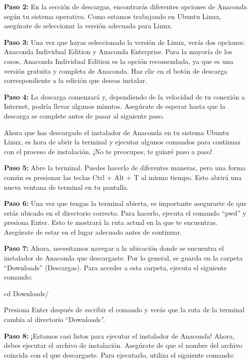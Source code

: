 \documentclass[
  jou,
  floatsintext,
  longtable,
  a4paper,
  nolmodern,
  notxfonts,
  notimes,
  colorlinks=true,linkcolor=blue,citecolor=blue,urlcolor=blue]{apa7}
\newenvironment{Shaded}{\begin{snugshade}}{\end{snugshade}}
\newcommand{\BuiltInTok}[1]{\textcolor[rgb]{0.00,0.23,0.31}{#1}}
\newcommand{\NormalTok}[1]{\textcolor[rgb]{0.00,0.23,0.31}{#1}}
\begin{document}
\textbf{Paso 2:} En la sección de descargas, encontrarás diferentes
opciones de Anaconda según tu sistema operativo. Como estamos trabajando
en Ubuntu Linux, asegúrate de seleccionar la versión adecuada para
Linux.

\textbf{Paso 3:} Una vez que hayas seleccionado la versión de Linux,
verás dos opciones: Anaconda Individual Edition y Anaconda Enterprise.
Para la mayoría de los casos, Anaconda Individual Edition es la opción
recomendada, ya que es una versión gratuita y completa de Anaconda. Haz
clic en el botón de descarga correspondiente a la edición que deseas
instalar.

\textbf{Paso 4:} La descarga comenzará y, dependiendo de la velocidad de
tu conexión a Internet, podría llevar algunos minutos. Asegúrate de
esperar hasta que la descarga se complete antes de pasar al siguiente
paso.

Ahora que has descargado el instalador de Anaconda en tu sistema Ubuntu
Linux, es hora de abrir la terminal y ejecutar algunos comandos para
continuar con el proceso de instalación. ¡No te preocupes, te guiaré
paso a paso!

\textbf{Paso 5:} Abre la terminal. Puedes hacerlo de diferentes maneras,
pero una forma común es presionar las teclas Ctrl + Alt + T al mismo
tiempo. Esto abrirá una nueva ventana de terminal en tu pantalla.

\textbf{Paso 6:} Una vez que tengas la terminal abierta, es importante
asegurarte de que estás ubicado en el directorio correcto. Para hacerlo,
ejecuta el comando ``pwd'' y presiona Enter. Esto te mostrará la ruta
actual en la que te encuentras. Asegúrate de estar en el lugar adecuado
antes de continuar.

\textbf{Paso 7:} Ahora, necesitamos navegar a la ubicación donde se
encuentra el instalador de Anaconda que descargaste. Por lo general, se
guarda en la carpeta ``Downloads'' (Descargas). Para acceder a esta
carpeta, ejecuta el siguiente comando:

\begin{Shaded}
\begin{Highlighting}[]
\BuiltInTok{cd}\NormalTok{ Downloads/}
\end{Highlighting}
\end{Shaded}

Presiona Enter después de escribir el comando y verás que la ruta de la
terminal cambia al directorio ``Downloads''.

\textbf{Paso 8:} ¡Estamos casi listos para ejecutar el instalador de
Anaconda! Ahora, debes ejecutar el archivo de instalación. Asegúrate de
que el nombre del archivo coincida con el que descargaste. Para
ejecutarlo, utiliza el siguiente comando:
\end{document}
